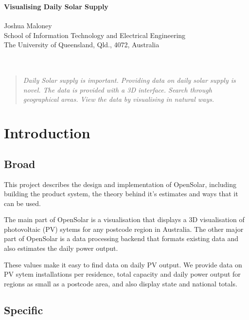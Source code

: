 \documentclass[10pt, a4paper]{article}
\begin{document}
\begin{center}
\Large
\textbf{Visualising Daily Solar Supply } \\ 
\hfill\\
\large
Joshua Maloney \\
School of Information Technology and Electrical Engineering \\
The University of Queensland, Qld., 4072, Australia \\
\hfill\\
\hfill\\
\end{center}


\begin{multicols}{2}

\begin{abstract}
\textit{
   Daily Solar supply is important.
   Providing data on daily solar supply is novel.
   The data is provided with a 3D interface.
   Search through geographical areas.
   View the data by visualising in natural ways.
  }
\end{abstract}

\section{Introduction}

\subsection{Broad}

This project describes the design and implementation of OpenSolar, including building the product system, the theory behind it's estimates and ways that it can be used. 

The main part of OpenSolar is a visualisation that displays a 3D visualisation of photovoltaic (PV) sytems for any postcode region in Australia. The other major part of OpenSolar is a data processing backend that formats existing data and also estimates the daily power output.

These values make it easy to find data on daily PV output. We provide data on PV sytem installations per residence, total capacity and daily power output for regions as small as a postcode area, and also display state and national totals.

\subsection{Specific}


\end{multicols}
\end{document}
